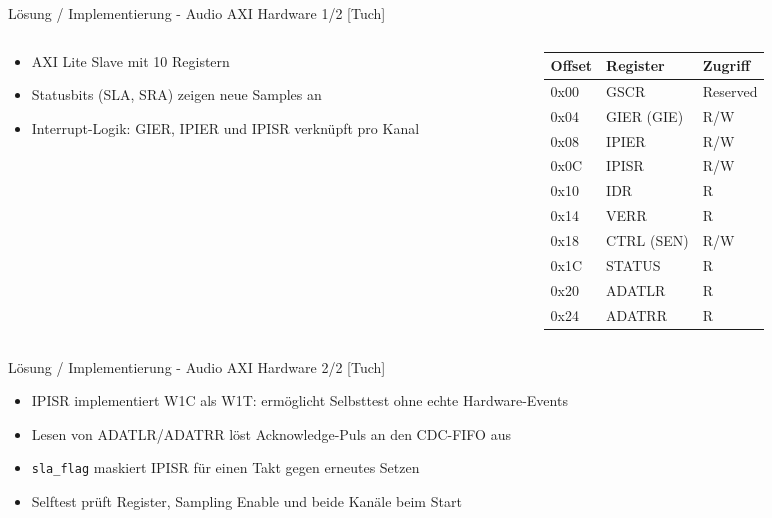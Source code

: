 \begin{frame}{Lösung / Implementierung - Audio AXI Hardware 1/2 [Tuch]}
    \begin{columns}[T]
        \begin{column}{0.55\textwidth}
            \begin{itemize}
                \item AXI Lite Slave mit 10 Registern
                \item Statusbits (SLA, SRA) zeigen neue Samples an
                \item Interrupt-Logik: GIER, IPIER und IPISR verknüpft pro Kanal
            \end{itemize}
        \end{column}
        \begin{column}{0.45\textwidth}
            \centering
            \footnotesize
            \begin{tabular}{lll}
                \toprule
                \textbf{Offset} & \textbf{Register} & \textbf{Zugriff} \\
                \midrule
                0x00 & GSCR & Reserved \\
                0x04 & GIER (GIE) & R/W \\
                0x08 & IPIER & R/W \\
                0x0C & IPISR & R/W \\
                0x10 & IDR & R \\
                0x14 & VERR & R \\
                0x18 & CTRL (SEN) & R/W \\
                0x1C & STATUS & R \\
                0x20 & ADATLR & R \\
                0x24 & ADATRR & R \\
                \bottomrule
            \end{tabular}
        \end{column}
    \end{columns}
\end{frame}
\begin{frame}{Lösung / Implementierung - Audio AXI Hardware 2/2 [Tuch]}
    \begin{itemize}
        \item IPISR implementiert W1C als W1T: ermöglicht Selbsttest ohne echte Hardware-Events
        \item Lesen von ADATLR/ADATRR löst Acknowledge-Puls an den CDC-FIFO aus
        \item \texttt{sla\_flag} maskiert IPISR für einen Takt gegen erneutes Setzen
        \item Selftest prüft Register, Sampling Enable und beide Kanäle beim Start
    \end{itemize}
\end{frame}
